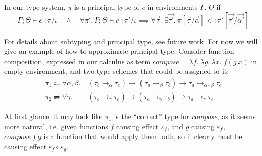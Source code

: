 \documentclass[declaration,shortabstract]{iithesis}
\newcommand{\types}[4][\Gamma;\Theta]{\ensuremath{{{#1} \vdash {#2} \: : {#3}/{#4}}}}
\newcommand{\arrow}[3]{{#1}\rightarrow_{#2}{#3}}
\newcommand{\lam}[1][x]{\ensuremath{\lambda #1.\:}}
\begin{document}
In our type system, $\pi$ is a principal type of $e$ in environments $\Gamma$, $\Theta$ if
$$ \types{e}{\pi}{\iota} \quad\wedge\quad
    \forall \pi'.\: \types{e}{\pi'}{\iota} \implies
    \forall \vec{\tau}.\: \exists \vec{\tau'}.\:
    \pi[\vec{\tau} / \vec{\alpha}] <: \pi'[\vec{\tau'} / \vec{\alpha'}]
$$

For details about subtyping and principal type, see \hyperlink{chapter.6}{future work}.
For now we will give an example of how to approximate principal type.
Consider function composition, expressed in our calculus as term
$\textit{compose} = \lam[f]\lam[g]\lam f (g\:x) $ in empty environment, and two type schemes that could be assigned to it:
\begin{align*}
    \pi_1\Coloneqq  \forall\alpha,\beta. &\:
    \arrow{(\arrow{\tau_b}{\alpha}{\tau_c})}{}{
        \arrow{(\arrow{\tau_a}{\beta}{\tau_b})}{}{
                \arrow{\tau_a}{\alpha \circ \beta}{\tau_c}}} 
    \\
    \pi_2\Coloneqq  \forall\gamma      . &\:
    \arrow{(\arrow{\tau_b}{\gamma}{\tau_c})}{}{
        \arrow{(\arrow{\tau_a}{\gamma}{\tau_b})}{}{
                \arrow{\tau_a}{\gamma}{\tau_c}}} 
\end{align*}

At first glance, it may look like $\pi_1$ is the ``correct'' type for \textit{compose}, as it seems more natural,
 i.e. given functions $f$ causing effect $\varepsilon_f$, and $g$ causing $\varepsilon_f$, $\textit{compose}\:f\:g$
is a function that would apply them both, so it clearly must be causing effect $\varepsilon_f \circ \varepsilon_g$.
\end{document}
